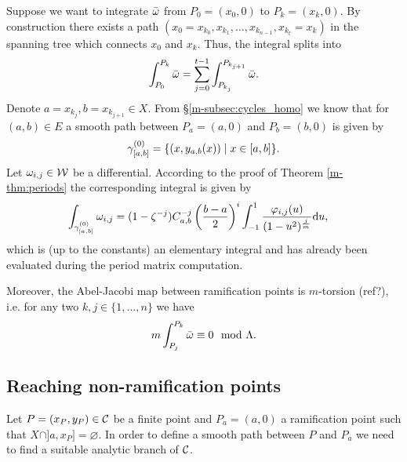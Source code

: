 \documentclass[main.tex]{subfiles}
\begin{document}
  Suppose we want to integrate $\bar{\omega}$ from $P_0 =(x_0,0)$ to $P_k = (x_k,0)$. By construction there exists a path
 $(x_0=x_{k_0},x_{k_1},\dots,x_{k_{n-1}},x_{k_t}=x_k)$ in the spanning tree which connects $x_0$ and $x_k$. Thus, the integral splits into
  \begin{align}
    \int_{P_0}^{P_k} \bar{\omega} = \sum_{j = 0}^{t-1}  \int_{P_{k_j}}^{P_{k_{j+1}}} \bar{\omega}.
  \end{align}
  Denote $a = x_{k_j}, b = x_{k_{j+1}} \in X$. From \S \ref{m-subsec:cycles_homo} we know that for $(a,b) \in E$ a smooth path between $P_a=(a,0)$ and $P_b=(b,0)$ is given by
  \begin{align*}
   \gamma_{[a,b]}^{(0)} = \{  (x,y_{a,b}(x))  \mid  x \in [a,b]  \}.
  \end{align*}
  Let $\omega_{i,j} \in \mathcal{W}$ be a differential. According to the proof of Theorem \ref{m-thm:periods} the corresponding integral is given by
  \begin{align}
   \int_{\gamma_{[a,b]}^{(0)}} \omega_{i,j}  & = 
   (1-\zeta^{-j}) C_{a,b}^{-j} \left(\frac{b-a}{2}\right)^i \int_{-1}^1 \frac{\varphi_{i,j}(u)}{(1-u^2)^{\frac{j}{m}}}  \mathrm d u,
  \end{align}
  which is  (up to the constants) an elementary integral and has already been evaluated during the period matrix computation.
  
  Moreover, the Abel-Jacobi map between ramification points is $m$-torsion (\todo ref?), i.e. for any two $k,j \in \{1,\dots,n\}$ we have
  \begin{equation}\label{eq:m_tors}
    m \int_{P_j}^{P_k} \bar{\omega} \equiv 0 \mod  \Lambda.
  \end{equation}


  \subsection{Reaching non-ramification points}\label{subsec:ajm_finite}

  Let $P = (x_P,y_P) \in \mathcal{C}$ be a finite point and $P_a = (a,0)$ a ramification point such that $X\cap]a,x_P]=\varnothing$. In order to define a smooth path between $P$ and $P_a$ 
  we need to find a suitable analytic branch of $\mathcal{C}$. 
  
\end{document}

